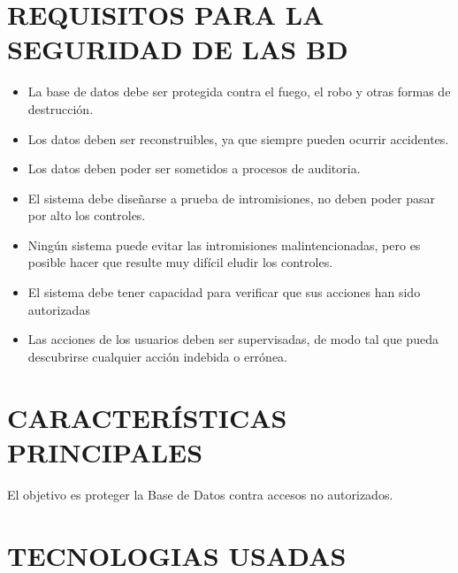 \documentclass[conference]{IEEEtran}
\begin{document}
\section{REQUISITOS PARA LA SEGURIDAD DE LAS BD}
\begin{itemize}
\item \textbf{} La base de datos debe ser protegida contra el fuego, el robo y otras formas de destrucción.
\\
\item \textbf{} Los datos deben ser reconstruibles, ya que siempre pueden ocurrir accidentes.
\\
\item \textbf{} Los datos deben poder ser sometidos a procesos de auditoria.
\\
\item \textbf{} El sistema debe diseñarse a prueba de intromisiones, no deben poder pasar por alto los controles.
\\
\item \textbf{} Ningún sistema puede evitar las intromisiones malintencionadas, pero es posible hacer que resulte muy difícil eludir los controles.
\\
\item \textbf{} El sistema debe tener capacidad para verificar que sus acciones han sido autorizadas
\\
\item \textbf{} Las acciones de los usuarios deben ser supervisadas, de modo tal que pueda descubrirse cualquier acción indebida o errónea.
\\
\end{itemize}

\section{CARACTERÍSTICAS PRINCIPALES}
El objetivo es proteger la Base de Datos contra
accesos no autorizados.


\section{TECNOLOGIAS USADAS}
\end{document}
